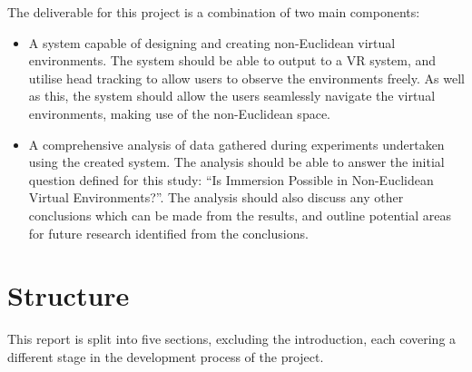		The deliverable for this project is a combination of two main components:
		\begin{itemize}
			\item A system capable of designing and creating non-Euclidean virtual environments.
			The system should be able to output to a VR system, and utilise head tracking to allow users to observe the environments freely.
			As well as this, the system should allow the users seamlessly navigate the virtual environments, making use of the non-Euclidean space.

			\item A comprehensive analysis of data gathered during experiments undertaken using the created system.
			The analysis should be able to answer the initial question defined for this study: \enquote{Is Immersion Possible in Non-Euclidean Virtual Environments?}.
			The analysis should also discuss any other conclusions which can be made from the results, and outline potential areas for future research identified from the conclusions.
		\end{itemize}

	\section{Structure}

		This report is split into five sections, excluding the introduction, each covering a different stage in the development process of the project.

